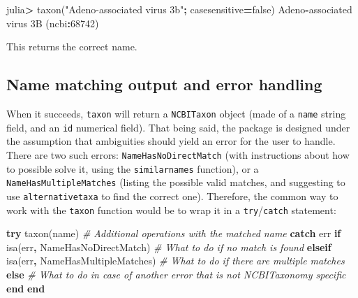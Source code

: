 \documentclass[10pt,oneside]{article}
\newenvironment{Shaded}{\begin{snugshade}}{\end{snugshade}}
\newcommand{\KeywordTok}[1]{\textcolor[rgb]{0.13,0.29,0.53}{\textbf{#1}}}
\newcommand{\FloatTok}[1]{\textcolor[rgb]{0.00,0.00,0.81}{#1}}
\newcommand{\StringTok}[1]{\textcolor[rgb]{0.31,0.60,0.02}{#1}}
\newcommand{\CommentTok}[1]{\textcolor[rgb]{0.56,0.35,0.01}{\textit{#1}}}
\newcommand{\OperatorTok}[1]{\textcolor[rgb]{0.81,0.36,0.00}{\textbf{#1}}}
\newcommand{\ExtensionTok}[1]{#1}
\newcommand{\NormalTok}[1]{#1}
\begin{document}
\begin{Shaded}
\begin{Highlighting}[]
\NormalTok{julia}\OperatorTok{\textgreater{}}\NormalTok{ taxon(}\StringTok{"Adeno{-}associated virus 3b"}\OperatorTok{;}\NormalTok{ casesensitive}\OperatorTok{=}\ExtensionTok{false}\NormalTok{)}
\NormalTok{Adeno}\OperatorTok{{-}}\NormalTok{associated virus }\FloatTok{3}\NormalTok{B (ncbi}\OperatorTok{:}\FloatTok{68742}\NormalTok{)}
\end{Highlighting}
\end{Shaded}

This returns the correct name.

\hypertarget{name-matching-output-and-error-handling}{%
\subsection{Name matching output and error
handling}\label{name-matching-output-and-error-handling}}

When it succeeds, \texttt{taxon} will return a \texttt{NCBITaxon} object
(made of a \texttt{name} string field, and an \texttt{id} numerical
field). That being said, the package is designed under the assumption
that ambiguities should yield an error for the user to handle. There are
two such errors: \texttt{NameHasNoDirectMatch} (with instructions about
how to possible solve it, using the \texttt{similarnames} function), or
a \texttt{NameHasMultipleMatches} (listing the possible valid matches,
and suggesting to use \texttt{alternativetaxa} to find the correct one).
Therefore, the common way to work with the \texttt{taxon} function would
be to wrap it in a \texttt{try}/\texttt{catch} statement:

\begin{Shaded}
\begin{Highlighting}[]
\KeywordTok{try}
\NormalTok{  taxon(name)}
  \CommentTok{\# Additional operations with the matched name}
\KeywordTok{catch}\NormalTok{ err}
  \KeywordTok{if}\NormalTok{ isa(err}\OperatorTok{,}\NormalTok{ NameHasNoDirectMatch)}
    \CommentTok{\# What to do if no match is found}
  \KeywordTok{elseif}\NormalTok{ isa(err}\OperatorTok{,}\NormalTok{ NameHasMultipleMatches)}
    \CommentTok{\# What to do if there are multiple matches}
  \KeywordTok{else}
    \CommentTok{\# What to do in case of another error that is not NCBITaxonomy specific}
  \KeywordTok{end}
\KeywordTok{end}
\end{Highlighting}
\end{Shaded}
\end{document}
